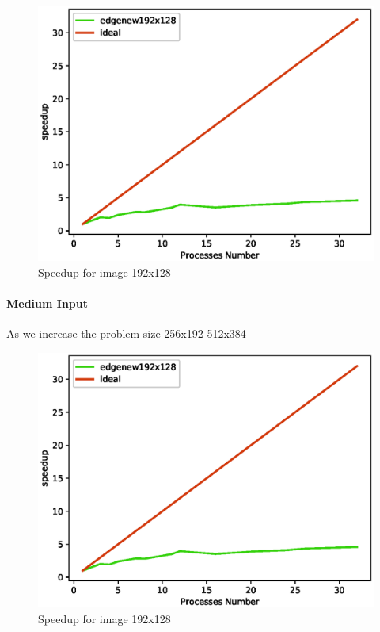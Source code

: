 \documentclass[12pt,a4paper]{article}
\begin{document}
                \begin{figure}[ht]
                    \centering
                    \includegraphics[scale=0.6]{../graphs/edgenew192x128_speedup.eps}
                    \caption{Speedup for image 192x128}
                    \label{speedup-192x128}
                \end{figure}
            
            \paragraph{Medium Input}
                As we increase the problem size 
                256x192 512x384
                \begin{figure}[ht]
                    \centering
                    \includegraphics[scale=0.6]{../graphs/edgenew192x128_speedup.eps}
                    \caption{Speedup for image 192x128}
                    \label{speedup-192x128}
                \end{figure}
\end{document}
